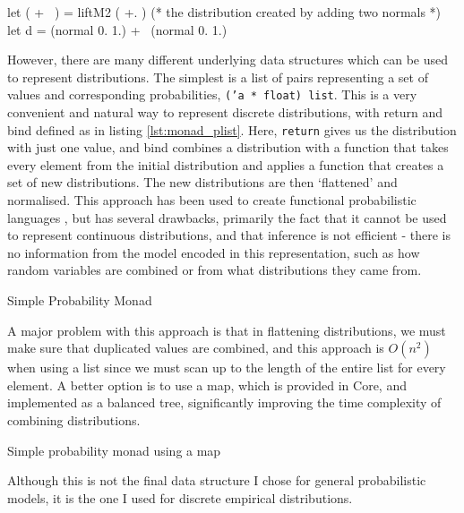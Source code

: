 \begin{ocamlcode-in}
let ( +~ ) = liftM2 ( +. )
(* the distribution created by adding two normals *)
let d = (normal 0. 1.) +~ (normal 0. 1.)
\end{ocamlcode-in}

However, there are many different underlying data structures which can be used to represent distributions. The simplest is a list of pairs representing a set of values and corresponding probabilities, \texttt{('a * float) list}. This is a very convenient and natural way to represent discrete distributions, with return and bind defined as in listing \ref{lst:monad_plist}. Here, \texttt{return} gives us the distribution with just one value, and bind combines a distribution with a function that takes every element from the initial distribution and applies a function that creates a set of new distributions. The new distributions are then `flattened' and normalised. This approach has been used to create functional probabilistic languages \cite{erwig}, but has several drawbacks, primarily the fact that it cannot be used to represent continuous distributions, and that inference is not efficient - there is no information from the model encoded in this representation, such as how random variables are combined or from what distributions they came from.


\begin{listing}[!ht]
	\caption{Simple Probability Monad}
	\label{lst:monad_plist}
\end{listing}

A major problem with this approach is that in flattening distributions, we must make sure that duplicated values are combined, and this approach is $O(n^2)$ when using a list since we must scan up to the length of the entire list for every element. A better option is to use a map, which is provided in Core, and implemented as a balanced tree, significantly improving the time complexity of combining distributions.

\begin{listing}[!ht]
	\caption{Simple probability monad using a map}
	\label{lst:monad_pmap}
\end{listing}

Although this is not the final data structure I chose for general probabilistic models, it is the one I used for discrete empirical distributions.

